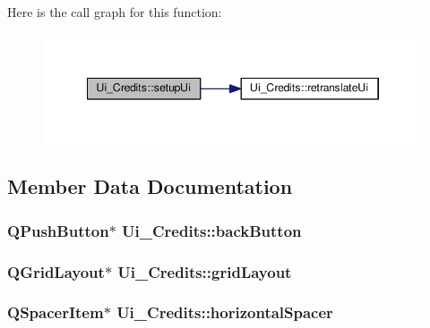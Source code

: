 Here is the call graph for this function\-:\nopagebreak
\begin{figure}[H]
\begin{center}
\leavevmode
\includegraphics[width=346pt]{classUi__Credits_a6bfca1eceb04ccf96dac510645927d75_cgraph}
\end{center}
\end{figure}




\subsection{Member Data Documentation}
\hypertarget{classUi__Credits_a2547ad85bfd6de3b24cf0735617603b5}{
\subsubsection[{back\-Button}]{\setlength{\rightskip}{0pt plus 5cm}Q\-Push\-Button$\ast$ Ui\-\_\-\-Credits\-::back\-Button}}\label{classUi__Credits_a2547ad85bfd6de3b24cf0735617603b5}
\hypertarget{classUi__Credits_a931689782ca1a0acbf9fbe3f8edc5739}{
\subsubsection[{grid\-Layout}]{\setlength{\rightskip}{0pt plus 5cm}Q\-Grid\-Layout$\ast$ Ui\-\_\-\-Credits\-::grid\-Layout}}\label{classUi__Credits_a931689782ca1a0acbf9fbe3f8edc5739}
\hypertarget{classUi__Credits_affbd440aaa12fdfad979f8b2e31e7a46}{
\subsubsection[{horizontal\-Spacer}]{\setlength{\rightskip}{0pt plus 5cm}Q\-Spacer\-Item$\ast$ Ui\-\_\-\-Credits\-::horizontal\-Spacer}}\label{classUi__Credits_affbd440aaa12fdfad979f8b2e31e7a46}
